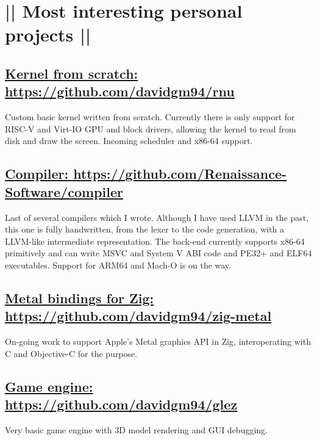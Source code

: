 \section*{|| Most interesting personal projects ||}
	\subsection*{\underline{Kernel from scratch: \href{https://github.com/davidgm94/rnu}{https://github.com/davidgm94/rnu}}}
	Custom basic kernel written from scratch. Currently there is only support for RISC-V and Virt-IO GPU and block drivers, allowing the kernel to read from disk and draw the screen. Incoming scheduler and x86-64 support.

	\subsection*{\underline{Compiler: \href{https://github.com/Renaissance-Software/compiler}{https://github.com/Renaissance-Software/compiler}}}
	Last of several compilers which I wrote. Although I have used LLVM in the past, this one is fully handwritten, from the lexer to the code generation, with a LLVM-like intermediate representation. The back-end currently supports x86-64 primitively and can write MSVC and System V ABI code and PE32+ and ELF64 executables. Support for ARM64 and Mach-O is on the way.
	
	\subsection*{\underline{Metal bindings for Zig: \href{https://github.com/davidgm94/zig-metal}{https://github.com/davidgm94/zig-metal}}}
	On-going work to support Apple's Metal graphics API in Zig, interoperating with C and Objective-C for the purpose.

	\subsection*{\underline{Game engine: \href{https://github.com/davidgm94/glez}{https://github.com/davidgm94/glez}}}
	Very basic game engine with 3D model rendering and GUI debugging.